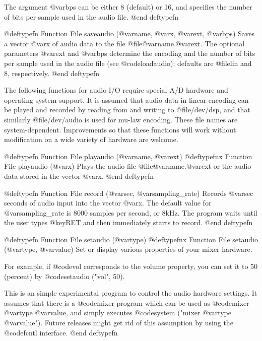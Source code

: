 The argument @var{bps} can be either 8 (default) or 16, and specifies
the number of bits per sample used in the audio file.
@end deftypefn

@deftypefn {Function File} {} saveaudio (@var{name}, @var{x}, @var{ext}, @var{bps})
Saves a vector @var{x} of audio data to the file
@file{@var{name}.@var{ext}}.  The optional parameters @var{ext} and
@var{bps} determine the encoding and the number of bits per sample used
in the audio file (see @code{loadaudio});  defaults are @file{lin} and
8, respectively.
@end deftypefn

The following functions for audio I/O require special A/D hardware and
operating system support.  It is assumed that audio data in linear
encoding can be played and recorded by reading from and writing to
@file{/dev/dsp}, and that similarly @file{/dev/audio} is used for mu-law
encoding.  These file names are system-dependent.  Improvements so that
these functions will work without modification on a wide variety of
hardware are welcome.

@deftypefn {Function File} {} playaudio (@var{name}, @var{ext})
@deftypefnx {Function File} {} playaudio (@var{x})
Plays the audio file @file{@var{name}.@var{ext}} or the audio data
stored in the vector @var{x}.
@end deftypefn

@deftypefn {Function File} {} record (@var{sec}, @var{sampling_rate})
Records @var{sec} seconds of audio input into the vector @var{x}.  The
default value for @var{sampling_rate} is 8000 samples per second, or
8kHz.  The program waits until the user types @key{RET} and then
immediately starts to record.
@end deftypefn

@deftypefn {Function File} {} setaudio (@var{type})
@deftypefnx {Function File} {} setaudio (@var{type}, @var{value})
Set or display various properties of your mixer hardware.

For example, if @code{vol} corresponds to the volume property, you can
set it to 50 (percent) by @code{setaudio ("vol", 50)}.

This is an simple experimental program to control the audio hardware
settings.  It assumes that there is a @code{mixer} program which can be
used as @code{mixer @var{type} @var{value}}, and simply executes
@code{system ("mixer @var{type} @var{value}")}.  Future releases might
get rid of this assumption by using the @code{fcntl} interface.
@end deftypefn

